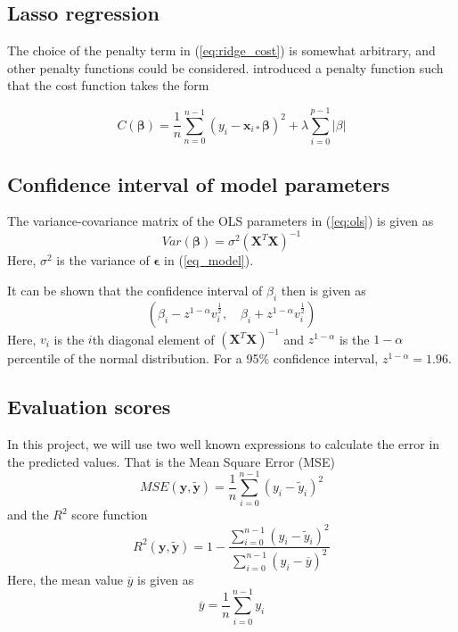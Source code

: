 \subsection{Lasso regression}
The choice of the penalty term in (\ref{eq:ridge_cost}) is somewhat arbitrary, and other penalty functions could be considered. \cite{tibshirani1996lasso} introduced a penalty function such that the cost function takes the form

\begin{equation*}
C(\boldsymbol{\beta})
= \frac{1}{n}\sum_{n=0}^{n-1} \left(y_i-\boldsymbol{x}_{i*}\boldsymbol{\beta}\right)^2 + \lambda \sum_{i=0}^{p-1}\left|\beta\right|
\end{equation*}

\subsection{Confidence interval of model parameters}
The variance-covariance matrix of the OLS parameters in (\ref{eq:ols}) is given as 
\begin{equation*}
	Var\left(\boldsymbol{\beta}\right) = \sigma^2\left(\boldsymbol{X}^T\boldsymbol{X}\right)^{-1}
\end{equation*}
Here, $\sigma^2$ is the variance of $\boldsymbol{\epsilon}$ in (\ref{eq_model}). 
 
It can be shown that the confidence interval of $\beta_i$ then is given as \citep{hastie2009elements}
\begin{equation*}
	(\beta_i-z^{1-\alpha}v_i^{\frac{1}{2}}, \quad \beta_i+z^{1-\alpha}v_i^{\frac{1}{2}})
\end{equation*}  
Here, $v_i$ is the $i$th diagonal element of $\left(\boldsymbol{X}^T\boldsymbol{X}\right)^{-1}$ and $z^{1-\alpha}$ is the $1-\alpha$ percentile of the normal distribution. For a 95\% confidence interval, $z^{1-\alpha}=1.96$.

\subsection{Evaluation scores}
In this project, we will use two well known expressions to calculate the error in the predicted values. That is the Mean Square Error (MSE)
\begin{equation}\label{eq:mse}
	MSE(\boldsymbol{y},\boldsymbol{\tilde{y}}) = \frac{1}{n} \sum_{i=0}^{n-1}\left(y_i-\tilde{y}_i\right)^2
\end{equation}
and the $R^2$ score function
\begin{equation}\label{eq:r2}
	R^2(\boldsymbol{y},\boldsymbol{\tilde{y}}) = 1- \frac{\sum_{i=0}^{n-1}\left(y_i-\tilde{y}_i\right)^2}{\sum_{i=0}^{n-1}\left(y_i-\overline{y}\right)^2}
\end{equation}
Here, the mean value $\overline{y}$ is given as
\begin{equation*}
	\overline{y}=\frac{1}{n}\sum_{i=0}^{n-1}y_i
\end{equation*}

